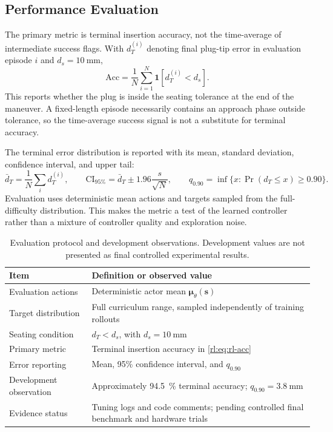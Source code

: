 \rlFloatBarrier

\subsection{Performance Evaluation}\label{rl:sec:rl-eval}

The primary metric is terminal insertion accuracy, not the time-average of intermediate success flags. With $d_T^{(i)}$ denoting final plug-tip error in evaluation episode $i$ and $d_s=\SI{10}{\milli\meter}$,
\begin{equation}
\mathrm{Acc}=\frac{1}{N}\sum_{i=1}^{N}\mathbf1\!\left[d_T^{(i)}<d_s\right].
\label{rl:eq:rl-acc}
\end{equation}
This reports whether the plug is inside the seating tolerance at the end of the maneuver. A fixed-length episode necessarily contains an approach phase outside tolerance, so the time-average success signal is not a substitute for terminal accuracy.

The terminal error distribution is reported with its mean, standard deviation, confidence interval, and upper tail:
\begin{equation}
\bar d_T=\frac1N\sum_i d_T^{(i)},\qquad
\mathrm{CI}_{95\%}=\bar d_T\pm1.96\frac{s}{\sqrt N},\qquad q_{0.90}=\inf\{x:\Pr(d_T\le x)\ge0.90\}.
\label{rl:eq:rl-ci}
\end{equation}
Evaluation uses deterministic mean actions and targets sampled from the full-difficulty distribution. This makes the metric a test of the learned controller rather than a mixture of controller quality and exploration noise.

\begin{table}[!ht]
\centering
\caption{Evaluation protocol and development observations. Development values are not presented as final controlled experimental results.}
\label{rl:tab:rl-evaluation}
\small
\setlength{\tabcolsep}{4pt}
\begin{tabular}{@{}p{}p{}@{}}
\toprule
Item & Definition or observed value \\
\midrule
Evaluation actions & Deterministic actor mean $\bm\mu_\theta(\bm s)$ \\
Target distribution & Full curriculum range, sampled independently of training rollouts \\
Seating condition & $d_T<d_s$, with $d_s=\SI{10}{\milli\meter}$ \\
Primary metric & Terminal insertion accuracy in \eqref{rl:eq:rl-acc} \\
Error reporting & Mean, 95\% confidence interval, and $q_{0.90}$ \\
Development observation & Approximately \SI{94.5}{\percent} terminal accuracy; $q_{0.90}=\SI{3.8}{\milli\meter}$ \\
Evidence status & Tuning logs and code comments; pending controlled final benchmark and hardware trials \\
\bottomrule
\end{tabular}
\end{table}

